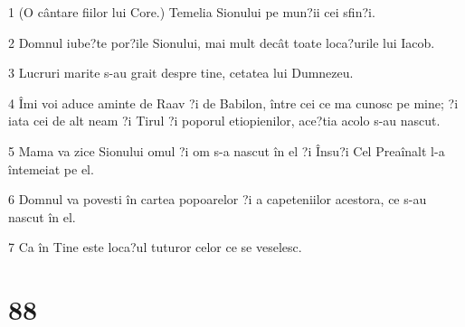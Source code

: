 \par 1 (O cântare fiilor lui Core.) Temelia Sionului pe mun?ii cei sfin?i.
\par 2 Domnul iube?te por?ile Sionului, mai mult decât toate loca?urile lui Iacob.
\par 3 Lucruri marite s-au grait despre tine, cetatea lui Dumnezeu.
\par 4 Îmi voi aduce aminte de Raav ?i de Babilon, între cei ce ma cunosc pe mine; ?i iata cei de alt neam ?i Tirul ?i poporul etiopienilor, ace?tia acolo s-au nascut.
\par 5 Mama va zice Sionului omul ?i om s-a nascut în el ?i Însu?i Cel Preaînalt l-a întemeiat pe el.
\par 6 Domnul va povesti în cartea popoarelor ?i a capeteniilor acestora, ce s-au nascut în el.
\par 7 Ca în Tine este loca?ul tuturor celor ce se veselesc.

\chapter{88}

